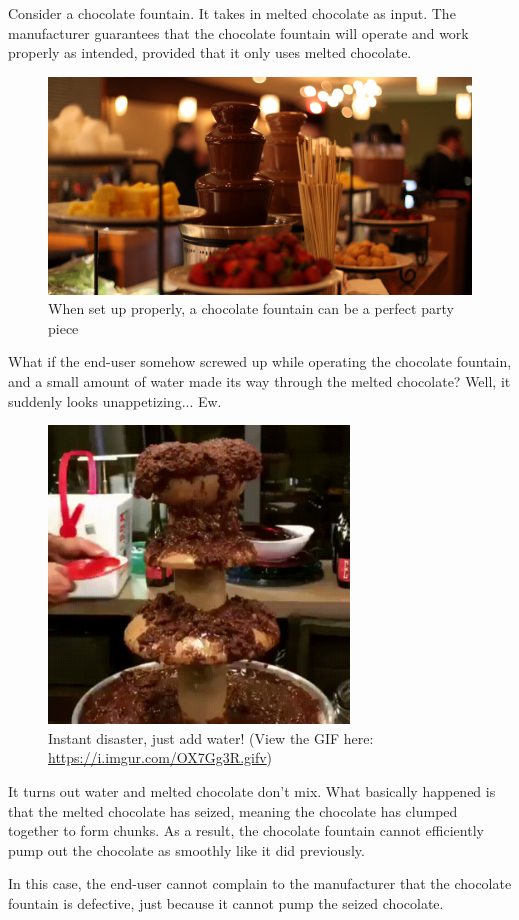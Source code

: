 \begin{example}
Consider a chocolate fountain. It takes in melted chocolate as input. The manufacturer guarantees that the chocolate fountain will operate and work properly as intended, provided that it only uses melted chocolate.

\begin{figure}[H]
    \centering
    \includegraphics[width=12cm]{figures/Chocolate-Fountains.png}
    \caption{When set up properly, a chocolate fountain can be a perfect party piece}
\end{figure}

What if the end-user somehow screwed up while operating the chocolate fountain, and a small amount of water made its way through the melted chocolate? Well, it suddenly looks unappetizing... Ew.

\begin{figure}[H]
    \centering
    \includegraphics[width=8cm]{figures/fountain_fail.png}
    \caption{Instant disaster, just add water! (View the GIF here: \url{https://i.imgur.com/OX7Gg3R.gifv})}
\end{figure}

It turns out water and melted chocolate don't mix. What basically happened is that the melted chocolate has seized, meaning the chocolate has clumped together to form chunks. As a result, the chocolate fountain cannot efficiently pump out the chocolate as smoothly like it did previously.

In this case, the end-user cannot complain to the manufacturer that the chocolate fountain is defective, just because it cannot pump the seized chocolate. 
\end{example}

